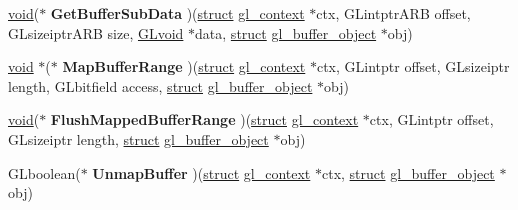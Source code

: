 \begin{Indent}
\begin{DoxyCompactItemize}
\item 
\mbox{\label{structdd__function__table_a0436d1e7fa127e6d587ca94eb0a93275}} 
\hyperlink{interfacevoid}{void}($\ast$ {\bfseries Get\+Buffer\+Sub\+Data} )(\hyperlink{interfacestruct}{struct} \hyperlink{structgl__context}{gl\+\_\+context} $\ast$ctx, G\+Lintptr\+A\+RB offset, G\+Lsizeiptr\+A\+RB size, \hyperlink{interfacevoid}{G\+Lvoid} $\ast$data, \hyperlink{interfacestruct}{struct} \hyperlink{structgl__buffer__object}{gl\+\_\+buffer\+\_\+object} $\ast$obj)
\item 
\mbox{\label{structdd__function__table_a45b176390a67ca379d33369f89618386}} 
\hyperlink{interfacevoid}{void} $\ast$($\ast$ {\bfseries Map\+Buffer\+Range} )(\hyperlink{interfacestruct}{struct} \hyperlink{structgl__context}{gl\+\_\+context} $\ast$ctx, G\+Lintptr offset, G\+Lsizeiptr length, G\+Lbitfield access, \hyperlink{interfacestruct}{struct} \hyperlink{structgl__buffer__object}{gl\+\_\+buffer\+\_\+object} $\ast$obj)
\item 
\mbox{\label{structdd__function__table_afd054faa4fd0c17cddf0c1612e1921be}} 
\hyperlink{interfacevoid}{void}($\ast$ {\bfseries Flush\+Mapped\+Buffer\+Range} )(\hyperlink{interfacestruct}{struct} \hyperlink{structgl__context}{gl\+\_\+context} $\ast$ctx, G\+Lintptr offset, G\+Lsizeiptr length, \hyperlink{interfacestruct}{struct} \hyperlink{structgl__buffer__object}{gl\+\_\+buffer\+\_\+object} $\ast$obj)
\item 
\mbox{\label{structdd__function__table_ad2e61010e5db0c77f16d420ad369803d}} 
G\+Lboolean($\ast$ {\bfseries Unmap\+Buffer} )(\hyperlink{interfacestruct}{struct} \hyperlink{structgl__context}{gl\+\_\+context} $\ast$ctx, \hyperlink{interfacestruct}{struct} \hyperlink{structgl__buffer__object}{gl\+\_\+buffer\+\_\+object} $\ast$obj)
\end{DoxyCompactItemize}
\end{Indent}
